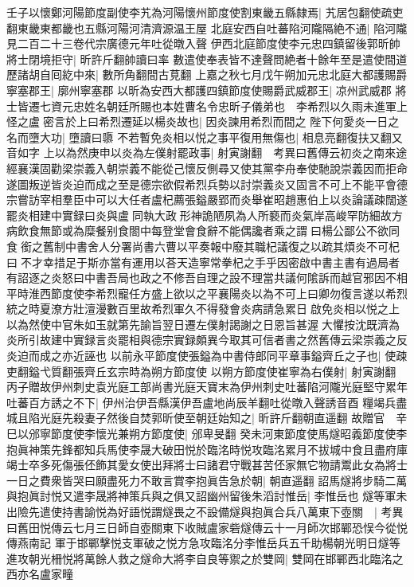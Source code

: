 壬子以懷鄭河陽節度副使李艽為河陽懷州節度使割東畿五縣隸焉|{
	艽居包翻使疏吏翻東畿東都畿也五縣河陽河清濟源温王屋}
北庭安西自吐蕃陷河隴隔絶不通|{
	陷河隴見二百二十三卷代宗廣德元年吐從暾入聲}
伊西北庭節度使李元忠四鎮留後郭昕帥將士閉境拒守|{
	昕許斤翻帥讀曰率}
數遣使奉表皆不達聲問絶者十餘年至是遣使間道歷諸胡自囘紇中來|{
	數所角翻間古莧翻}
上嘉之秋七月戊午朔加元忠北庭大都護賜爵寧塞郡王|{
	廓州寧塞郡}
以昕為安西大都護四鎮節度使賜爵武威郡王|{
	凉州武威郡}
將士皆遷七資元忠姓名朝廷所賜也本姓曹名令忠昕子儀弟也　李希烈以久雨未進軍上怪之盧密言於上曰希烈遷延以楊炎故也|{
	因炎諫用希烈而間之}
陛下何愛炎一日之名而墮大功|{
	墮讀曰隳}
不若暫免炎相以悦之事平復用無傷也|{
	相息亮翻復扶又翻又音如字}
上以為然庚申以炎為左僕射罷政事|{
	射寅謝翻　考異曰舊傳云初炎之南來途經襄漢固勸梁崇義入朝崇義不能從己懷反側尋又使其黨李舟奉使馳說崇義因而拒命遂圖叛逆皆炎迫而成之至是德宗欲假希烈兵勢以討崇義炎又固言不可上不能平會德宗嘗訪宰相羣臣中可以大任者盧杞薦張鎰嚴郢而炎舉崔昭趙惠伯上以炎論議疎闊遂罷炎相建中實録曰炎與盧同執大政形神詭陋夙為人所褻而炎氣岸高峻罕防細故方病飲食無節或為糜餐别食閤中每登堂會食辭不能偶讒者乘之謂曰楊公鄙公不欲同食銜之舊制中書舍人分署尚書六曹以平奏報中廢其職杞議復之以疏其煩炎不可杞曰不才幸措足于斯亦當有運用以荅天造寧常拳杞之手乎因密啟中書主書有過局者有詔逐之炎怒曰中書吾局也政之不修吾自理之設不理當共議何隂訴而越官邪因不相平時淮西節度使李希烈寵任方盛上欲以之平襄陽炎以為不可上曰卿勿復言遂以希烈統之時夏潦方壯澶漫數百里故希烈軍久不得發會炎病請急累日啟免炎相以悦之上以為然使中官朱如玉就第先諭旨翌日遷左僕射謁謝之日恩旨甚渥大懼按沈既濟為炎所引故建中實録言炎罷相與德宗實録頗異今取其可信者書之然舊傳云梁崇義之反炎迫而成之亦近誣也}
以前永平節度使張鎰為中書侍郎同平章事鎰齊丘之子也|{
	使疎吏翻鎰弋質翻張齊丘玄宗時為朔方節度使}
以朔方節度使崔寧為右僕射|{
	射寅謝翻}
丙子贈故伊州刺史袁光庭工部尚書光庭天寶末為伊州刺史吐蕃陷河隴光庭堅守累年吐蕃百方誘之不下|{
	伊州治伊吾縣漢伊吾盧地尚辰羊翻吐從暾入聲誘音酉}
糧竭兵盡城且陷光庭先殺妻子然後自焚郭昕使至朝廷始知之|{
	昕許斤翻朝直遥翻}
故贈官　辛巳以邠寧節度使李懷光兼朔方節度使|{
	邠卑旻翻}
癸未河東節度使馬燧昭義節度使李抱眞神策先鋒都知兵馬使李晟大破田悦於臨洺時悦攻臨洺累月不拔城中食且盡府庫竭士卒多死傷張伾飾其愛女使出拜將士曰諸君守戰甚苦伾家無它物請鬻此女為將士一日之費衆皆哭曰願盡死力不敢言賞李抱眞告急於朝|{
	朝直遥翻}
詔馬燧將步騎二萬與抱眞討悦又遣李晟將神策兵與之俱又詔幽州留後朱滔討惟岳|{
	李惟岳也}
燧等軍未出險先遣使持書諭悦為好語悦謂燧畏之不設備燧與抱眞合兵八萬東下壺關　|{
	考異曰舊田悦傳云七月三日師自壺關東下收賊盧家砦燧傳云十一月師次邯鄲恐悮今從悦傳燕南記}
軍于邯鄲擊悦支軍破之悦方急攻臨洺分李惟岳兵五千助楊朝光明日燧等進攻朝光柵悦將萬餘人救之燧命大將李自良等禦之於雙岡|{
	雙岡在邯鄲西北臨洺之西亦名盧家疃}

